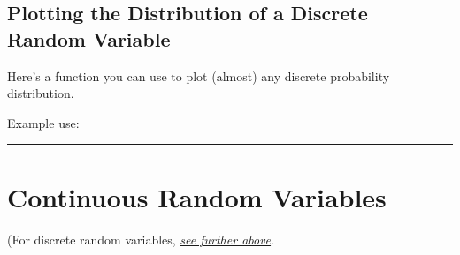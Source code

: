 \documentclass[letterpaper,10pt,english]{sphinxmanual}
\begin{document}
\subsection{Plotting the Distribution of a Discrete Random Variable}
\label{\detokenize{GB213-review-in-Python:plotting-the-distribution-of-a-discrete-random-variable}}
Here’s a function you can use to plot (almost) any discrete probability distribution.

\begin{sphinxVerbatim}[commandchars=\\\{\}]
    
            
         
        
        
        
      
\end{sphinxVerbatim}

Example use:

\begin{sphinxVerbatim}[commandchars=\\\{\}]
  
\end{sphinxVerbatim}

\noindent{}


\bigskip\hrule\bigskip



\section{Continuous Random Variables}
\label{\detokenize{GB213-review-in-Python:continuous-random-variables}}
(For discrete random variables, {\hyperref[\detokenize{GB213-review-in-Python:discrete-random-variables}]{\emph{see further above}}}.
\end{document}
